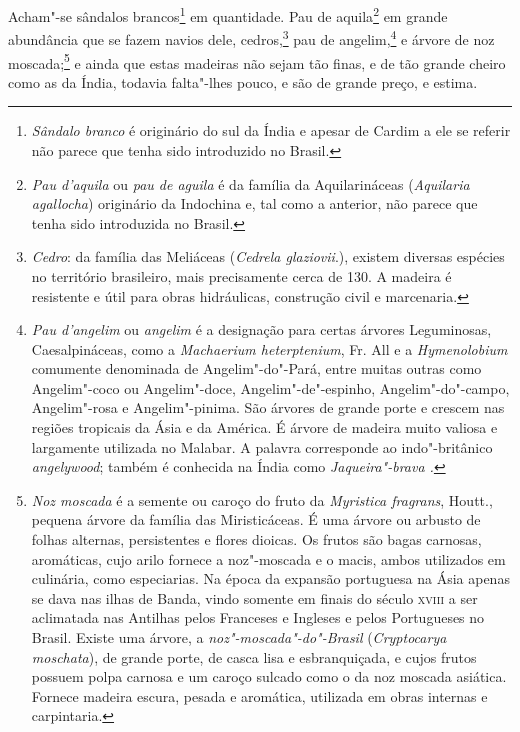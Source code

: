 Acham"-se sândalos brancos\footnote{ \textit{Sândalo branco} é
originário do sul da Índia e apesar de Cardim a ele se referir não
parece que tenha sido introduzido no Brasil.} em quantidade. Pau de
aquila\footnote{ \textit{Pau d'aquila} ou \textit{pau de aguila} é
da família da Aquilarináceas (\textit{Aquilaria agallocha}) originário
da Indochina e, tal como a anterior, não parece que tenha sido
introduzida no Brasil.} em grande abundância que se fazem navios dele,
cedros,\footnote{ \textit{Cedro}: da família das Meliáceas 
(\textit{Cedrela glaziovii}.), existem diversas espécies no território
brasileiro, mais precisamente cerca de 130. A madeira é resistente e
útil para obras hidráulicas, construção civil e marcenaria.} pau de
angelim,\footnote{ \textit{Pau d'angelim} ou \textit{angelim} é a
designação para certas árvores Leguminosas, Caesalpináceas, como a 
\textit{Machaerium heterptenium}, Fr. All e a \textit{Hymenolobium} 
comumente denominada de Angelim"-do"-Pará, entre muitas outras como
Angelim"-coco ou Angelim"-doce, Angelim"-de"-espinho, Angelim"-do"-campo,
Angelim"-rosa e Angelim"-pinima. São árvores de grande porte e crescem
nas regiões tropicais da Ásia e da América. É árvore de madeira muito
valiosa e largamente utilizada no Malabar. A palavra corresponde ao
indo"-britânico \textit{angelywood}; também é conhecida na Índia como
\textit{Jaqueira"-brava .} } e árvore de noz moscada;\footnote{ \textit{Noz moscada} 
é a semente ou caroço do fruto da \textit{Myristica fragrans}, Houtt., pequena árvore da família das
Miristicáceas. É uma árvore ou arbusto de folhas alternas, persistentes
e flores dioicas. Os frutos são bagas carnosas, aromáticas, cujo arilo
fornece a noz"-moscada e o macis, ambos utilizados em culinária, como
especiarias. Na época da expansão portuguesa na Ásia apenas se dava nas
ilhas de Banda, vindo somente em finais do século \textsc{xviii} a ser
aclimatada nas Antilhas pelos Franceses e Ingleses e pelos Portugueses
no Brasil. Existe uma árvore, a \textit{noz"-moscada"-do"-Brasil} (\textit{Cryptocarya moschata}), 
de grande porte, de casca lisa e esbranquiçada,
e cujos frutos possuem polpa carnosa e um caroço sulcado como o da noz
moscada asiática. Fornece madeira escura, pesada e aromática, utilizada
em obras internas e carpintaria.} e ainda que estas madeiras não sejam
tão finas, e de tão grande cheiro como as da Índia, todavia falta"-lhes
pouco, e são de grande preço, e estima.

